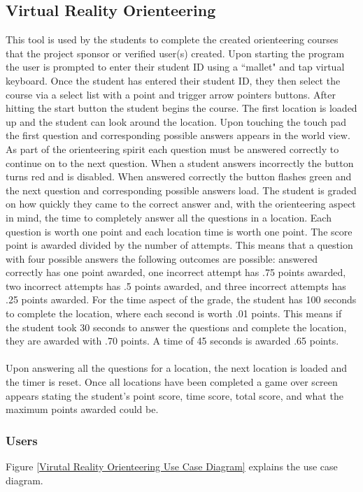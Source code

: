 \subsection{Virtual Reality Orienteering}
This tool is used by the students to complete the created orienteering courses that the project sponsor or verified user(s) created. Upon starting the program the user is prompted to enter their student ID using a ``mallet" and tap virtual keyboard. Once the student has entered their student ID, they then select the course via a select list with a point and trigger arrow pointers buttons. After hitting the start button the student begins the course. The first location is loaded up and the student can look around the location. Upon touching the touch pad the first question and corresponding possible answers appears in the world view. As part of the orienteering spirit each question must be answered correctly to continue on to the next question. When a student answers incorrectly the button turns red and is disabled. When answered correctly the button flashes green and the next question and corresponding possible answers load. The student is graded on how quickly they came to the correct answer and, with the orienteering aspect in mind, the time to completely answer all the questions in a location. Each question is worth one point and each location time is worth one point. The score point is awarded divided by the number of attempts. This means that a question with four possible answers the following outcomes are possible: answered correctly has one point awarded, one incorrect attempt has .75 points awarded, two incorrect attempts has .5 points awarded, and three incorrect attempts has .25 points awarded. For the time aspect of the grade, the student has 100 seconds to complete the location, where each second is worth .01 points. This means if the student took 30 seconds to answer the questions and complete the location, they are awarded with .70 points. A time of 45 seconds is awarded .65 points. \\
\\
Upon answering all the questions for a location, the next location is loaded and the timer is reset. Once all locations have been completed a game over screen appears stating the student's point score, time score, total score, and what the maximum points awarded could be. 
\subsubsection{Users}
Figure \ref{Virutal Reality Orienteering Use Case Diagram} explains the use case diagram.

